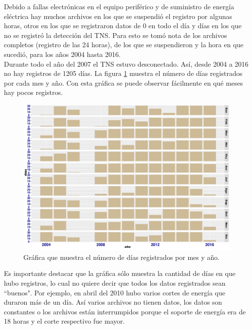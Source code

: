 Debido a fallas electrónicas en el equipo periférico y de suministro de energía eléctrica hay muchos archivos en los que se suspendió el registro por algunas horas, otros en los que se registraron datos de 0 en todo el día y días en los que no se registró la detección del TNS. Para esto se tomó nota de los archivos completos (registro de las 24 horas), de los que se suspendieron y la hora en que sucedió, para los años 2004 hasta 2016.\\

Durante todo el año del 2007 el TNS estuvo desconectado. Así, desde 2004 a 2016 no hay registros de 1205 días. La figura \ref{detec} muestra el número de días registrados por cada mes y año. Con esta gráfica se puede observar fácilmente en qué meses hay pocos registros.\\

 \begin{figure}[H]
  \centering
    \includegraphics[scale=0.45]{Capitulo2/figs/detectados.pdf}      %
  
  \caption{Gráfica que muestra el número de días registrados por mes y año.}            %
  \label{detec}                            %
\end{figure}

Es importante destacar que la gráfica sólo muestra la cantidad de días en que hubo registros, lo cual no quiere decir que todos los datos registrados sean ``buenos". Por ejemplo, en abril del 2010 hubo varios cortes de energía que duraron más de un día. Así varios archivos no tienen datos, los datos son constantes o los archivos están interrumpidos porque el soporte de energía era de 18 horas y el corte respectivo fue mayor.\\
  
